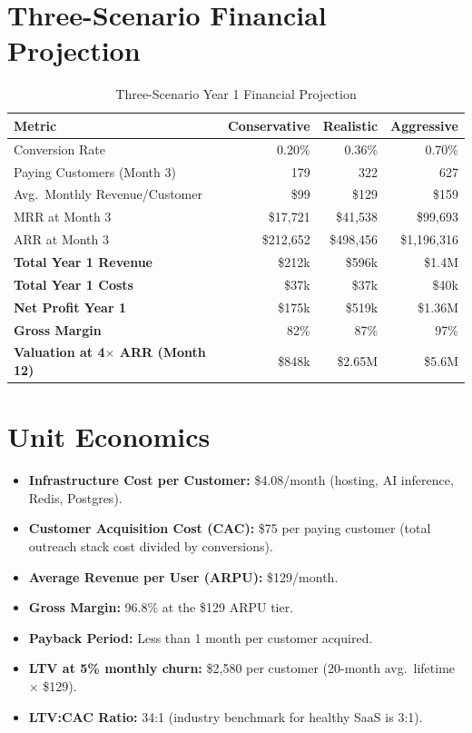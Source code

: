 \documentclass[11pt,a4paper]{report}
\begin{document}
\section{Three-Scenario Financial Projection}

\begin{table}[h]
\centering
\renewcommand{\arraystretch}{1.4}
\begin{tabularx}{\textwidth}{@{} X r r r @{}}
\toprule
\textbf{Metric} & \textbf{Conservative} & \textbf{Realistic} & \textbf{Aggressive} \\
\midrule
Conversion Rate             & 0.20\%     & 0.36\%     & 0.70\%      \\
Paying Customers (Month 3)  & 179        & 322        & 627         \\
Avg.\ Monthly Revenue/Customer & \$99    & \$129      & \$159       \\
MRR at Month 3              & \$17,721   & \$41,538   & \$99,693    \\
ARR at Month 3              & \$212,652  & \$498,456  & \$1,196,316 \\
\midrule
\textbf{Total Year 1 Revenue}   & \$212k & \$596k & \$1.4M \\
\textbf{Total Year 1 Costs}     & \$37k  & \$37k  & \$40k  \\
\textbf{Net Profit Year 1}      & \$175k & \$519k & \$1.36M \\
\textbf{Gross Margin}           & 82\%   & 87\%   & 97\%   \\
\textbf{Valuation at 4$\times$ ARR (Month 12)} & \$848k & \$2.65M & \$5.6M \\
\bottomrule
\end{tabularx}
\caption{Three-Scenario Year 1 Financial Projection}
\end{table}

\section{Unit Economics}
\begin{itemize}
    \item \textbf{Infrastructure Cost per Customer:} \$4.08/month (hosting, AI inference, Redis, Postgres).
    \item \textbf{Customer Acquisition Cost (CAC):} \$75 per paying customer (total outreach stack cost divided by conversions).
    \item \textbf{Average Revenue per User (ARPU):} \$129/month.
    \item \textbf{Gross Margin:} 96.8\% at the \$129 ARPU tier.
    \item \textbf{Payback Period:} Less than 1 month per customer acquired.
    \item \textbf{LTV at 5\% monthly churn:} \$2,580 per customer (20-month avg.\ lifetime $\times$ \$129).
    \item \textbf{LTV:CAC Ratio:} 34:1 (industry benchmark for healthy SaaS is 3:1).
\end{itemize}
\end{document}
